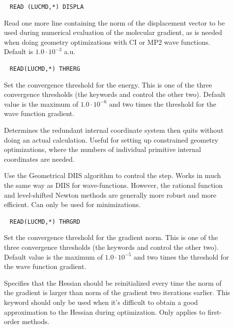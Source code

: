 \begin{description}
\item[]\verb| |\newline
\verb|READ (LUCMD,*) DISPLA|

Read one more line containing the norm of the displacement vector to
be used during numerical evaluation of the molecular gradient, as is
needed when doing geometry optimizations with CI or MP2 wave
functions. Default is $1.0\cdot 10^{-3}$ a.u.

\item[]\verb| |
\newline
\verb|READ(LUCMD,*) THRERG|

Set the convergence threshold for the energy. This is one of the three
convergence thresholds (the keywords
 and 
control the other two). Default value is the maximum of $1.0\cdot
10^{-6}$ and two times the threshold for the wave function gradient.

\item[]
Determines the redundant internal coordinate system then quits without
doing an actual calculation. Useful for setting up constrained
geometry optimizations, where the numbers of individual primitive
internal coordinates are needed.

\item[]
Use the Geometrical DIIS\cite{pcppjms114} algorithm to control the
step. Works in much the same way as DIIS for wave-functions. However,
the rational function and level-shifted Newton methods are generally
more robust and more efficient. Can only be used for minimizations.

\item[]\verb| |
\newline
\verb|READ(LUCMD,*) THRGRD|

Set the convergence threshold for the gradient norm. This is one of
the three convergence thresholds (the keywords  and
 control the other two). Default value is the maximum of
$1.0\cdot 10^{-5}$ and two times the threshold for the wave function
gradient.

\item[]
Specifies that the Hessian should be
reinitialized every time the norm
of the gradient is larger than norm of the gradient two iterations
earlier. This keyword should only be used when it's difficult to
obtain a good approximation to the Hessian during optimization. Only
applies to first-order methods.


\end{description}
